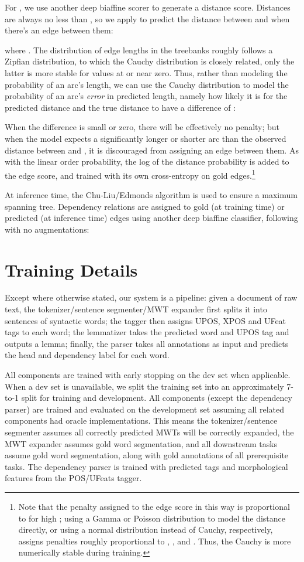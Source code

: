 \documentclass[11pt,a4paper]{article}
\begin{document}
For , we use another deep biaffine scorer to generate a distance score. Distances are always no less than , so we apply  to predict the distance between  and  when there's an edge between them:

where .
The distribution of edge lengths in the treebanks roughly follows a Zipfian distribution, to which the Cauchy distribution is closely related, only the latter is more stable for values at or near zero. Thus, rather than modeling the probability of an arc's length, we can use the Cauchy distribution to model the probability of an arc's \emph{error} in predicted length, namely how likely it is for the predicted distance and the true distance to have a difference of :

When the difference  is small or zero, there will be effectively no penalty; but when the model expects a significantly longer or shorter arc than the observed distance between  and , it is discouraged from assigning an edge between them. As with the linear order probability, the log of the distance probability is added to the edge score, and trained with its own cross-entropy on gold edges.\footnote{Note that the penalty assigned to the edge score in this way is proportional to  for high ;
using a Gamma or Poisson distribution to model the distance directly, or using a normal distribution instead of Cauchy, respectively, assigns penalties roughly proportional to , , and .
Thus, the Cauchy is more numerically stable during training.}

At inference time, the Chu-Liu/Edmonds algorithm \citep{chu1965shortest,edmonds1967optimum} is used to ensure a maximum spanning tree. Dependency relations are assigned to gold (at training time) or predicted (at inference time) edges  using another deep biaffine classifier, following \cite{dozat-qi-manning:2017:K17-3} with no augmentations: 
\section{Training Details}
Except where otherwise stated, our system is a pipeline: given a document of raw text, the tokenizer/sentence segmenter/MWT expander first splits it into sentences of syntactic words; the tagger then assigns UPOS, XPOS and UFeat tags to each word; the lemmatizer takes the predicted word and UPOS tag and outputs a lemma; finally, the parser takes all annotations as input and predicts the head and dependency label for each word.

All components are trained with early stopping on the dev set when applicable.
When a dev set is unavailable, we split the training set into an approximately 7-to-1 split for training and development.
All components (except the dependency parser) are trained and evaluated on the development set assuming all related components had oracle implementations.
This means the tokenizer/sentence segmenter assumes all correctly predicted MWTs will be correctly expanded, the MWT expander assumes gold word segmentation, and all downstream tasks assume gold word segmentation, along with gold annotations of all prerequisite tasks.
The dependency parser is trained with predicted tags and morphological features from the POS/UFeats tagger.
\end{document}
